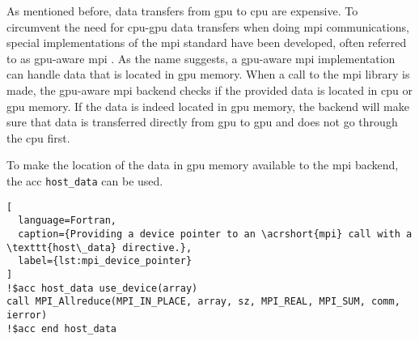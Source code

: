 As mentioned before, data transfers from \acrshort{gpu} to \acrshort{cpu} are expensive. To circumvent the need for \acrshort{cpu}-\acrshort{gpu} data transfers when doing \acrshort{mpi} communications, special implementations of the \acrshort{mpi} standard have been developed, often referred to as \acrshort{gpu}-aware \acrshort{mpi} \citep{potluriEfficientInternodeMPI2013}. As the name suggests, a \acrshort{gpu}-aware \acrshort{mpi} implementation can handle data that is located in \acrshort{gpu} memory. When a call to the \acrshort{mpi} library is made, the \acrshort{gpu}-aware \acrshort{mpi} backend checks if the provided data is located in \acrshort{cpu} or \acrshort{gpu} memory. If the data is indeed located in \acrshort{gpu} memory, the backend will make sure that data is transferred directly from \acrshort{gpu} to \acrshort{gpu} and does not go through the \acrshort{cpu} first. 

To make the location of the data in \acrshort{gpu} memory available to the \acrshort{mpi} backend, the \acrshort{acc} \texttt{host\_data} can be used. 

\begin{lstlisting}[
  language=Fortran,
  caption={Providing a device pointer to an \acrshort{mpi} call with a \texttt{host\_data} directive.},
  label={lst:mpi_device_pointer}
]
!$acc host_data use_device(array)
call MPI_Allreduce(MPI_IN_PLACE, array, sz, MPI_REAL, MPI_SUM, comm, ierror)
!$acc end host_data
\end{lstlisting}
